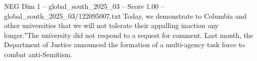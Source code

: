 \begin{textsample}{NEG Dim 1 – global\_south\_2025\_03 – Score 1.00 – global\_south\_2025\_03/122095007.txt}
Today, we demonstrate to Columbia and other universities that we will not tolerate their appalling inaction any longer."The university did not respond to a request for comment.
Last month, the Department of Justice announced the formation of a multi-agency task force to combat anti-Semitism.

\end{textsample}
